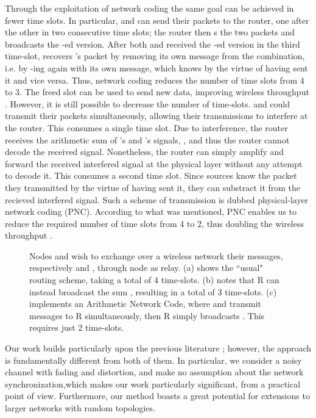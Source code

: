 \documentclass[conference]{IEEEtran}
\begin{document}
Through the exploitation of network coding the same goal can be achieved in fewer time slots. In particular,  and  can send their packets to the router, one after the other in two consecutive time slots; the router then s the two packets and broadcasts the -ed version. After both  and  received the -ed version in the third time-slot,  recovers 's packet by removing its own message from the combination, i.e. by -ing again with its own message, which  knows by the virtue of having sent it and vice versa. Thus, network coding reduces the number of time slots from 4 to 3. The freed slot can be used to send new data, improving wireless throughput \cite{noh,sizdah}.
However, it is still possible to decrease the number of time-slots.  and  could transmit their packets simultaneously, allowing their transmissions to interfere at the router. This consumes a single time slot. Due to interference, the router receives the arithmetic sum of 's and 's signals, , and thus the router cannot decode the received signal. Nonetheless, the router can simply amplify and forward the received interfered signal at the physical layer without any attempt to decode it. This consumes a second time slot. Since sources know the packet they transmitted by the virtue of having sent it, they can substract it from the recieved interfered signal. Such a scheme of transmission is dubbed physical-layer network coding (PNC). According to what was mentioned, PNC enables us to reduce the required number of time slots from 4 to 2, thus doubling the wireless throughput \cite{yek,do}.

\begin{figure*}[ht]
\centering
{}
\caption{Nodes  and  wish to exchange over a wireless network their messages, respectively  and , through node  as relay. (a) shows the ``usual" routing scheme, taking a total of 4 time-slots. (b) notes that R can instead broadcast the sum , resulting in a total of 3 time-slots. (c) implements an Arithmetic Network Code, where  and  transmit messages to R simultaneously, then R simply broadcasts . This requires just 2 time-slots.}
\vspace{-.1in}
\label{fig:figure1}
\end{figure*}

Our work builds particularly upon the previous literature \cite{yek,do}; however, the approach is fundamentally different from both of them. In particular, we consider a noisy channel with fading and distortion, and make no assumption about the network synchronization,which makes our work particularly significant, from a practical point of view. Furthermore, our method boasts a great potential for extensions to larger networks with random topologies.
\end{document}
